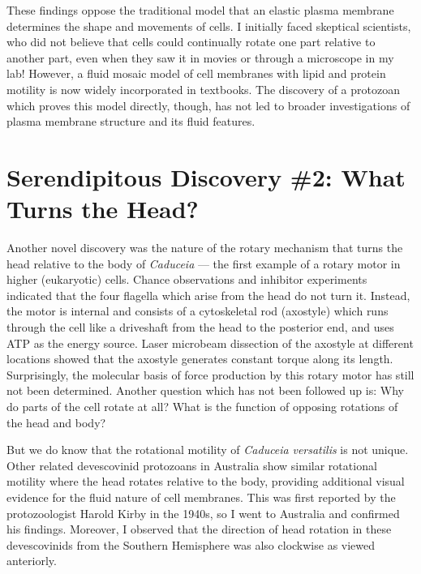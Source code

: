 \documentclass[authordate, anecdote]{jote-new-article}
\begin{document}
	These findings oppose the traditional model that an elastic plasma membrane determines the shape and movements of cells. I initially faced skeptical scientists, who did not believe that cells could continually rotate one part relative to another part, even when they saw it in movies or through a microscope in my lab! However, a fluid mosaic model of cell membranes with lipid and protein motility is now widely incorporated in textbooks. The discovery of a protozoan which proves this model directly, though, has not led to broader investigations of plasma membrane structure and its fluid features.







	\section{Serendipitous Discovery \#2: What Turns the Head? }







	Another novel discovery was the nature of the rotary mechanism that turns the head relative to the body of \emph{Caduceia} — the first example of a rotary motor in higher (eukaryotic) cells. Chance observations and inhibitor experiments indicated that the four flagella which arise from the head do not turn it. Instead, the motor is internal and consists of a cytoskeletal rod (axostyle) which runs through the cell like a driveshaft from the head to the posterior end, and uses ATP as the energy source. Laser microbeam dissection of the axostyle at different locations showed that the axostyle generates constant torque along its length. Surprisingly, the molecular basis of force production by this rotary motor has still not been determined. Another question which has not been followed up is: Why do parts of the cell rotate at all? What is the function of opposing rotations of the head and body?
	







	But we do know that the rotational motility of \emph{Caduceia}\emph{ }\emph{versatilis} is not unique. Other related devescovinid protozoans in Australia show similar rotational motility where the head rotates relative to the body, providing additional visual evidence for the fluid nature of cell membranes. This was first reported by the protozoologist Harold Kirby in the 1940s, so I went to Australia and confirmed his findings. Moreover, I observed that the direction of head rotation in these devescovinids from the Southern Hemisphere was also clockwise as viewed anteriorly.
\end{document}
